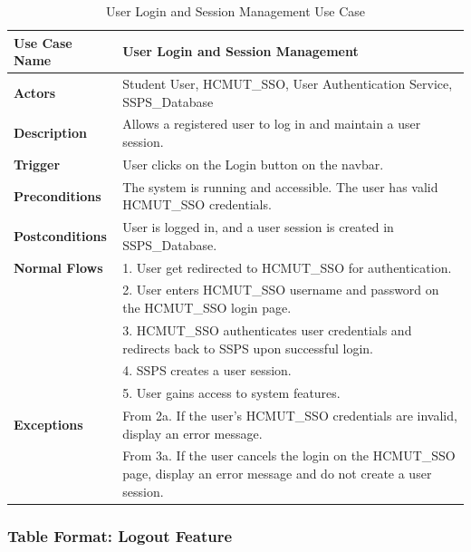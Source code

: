 \begin{table}[H]
\begin{tabular}{|p{5cm}|p{9cm}|}
\hline
\textbf{Use Case Name} & User Login and Session Management \\
\hline
\textbf{Actors} & Student User, HCMUT\_SSO, User Authentication Service, SSPS\_Database \\
\hline
\textbf{Description} & Allows a registered user to log in and maintain a user session. \\
\hline
\textbf{Trigger} & User clicks on the Login button on the navbar. \\
\hline
\textbf{Preconditions} & The system is running and accessible. The user has valid HCMUT\_SSO credentials. \\
\hline
\textbf{Postconditions} & User is logged in, and a user session is created in SSPS\_Database. \\
\hline
\textbf{Normal Flows} & 
1. User get redirected to HCMUT\_SSO for authentication. \\
&2. User enters HCMUT\_SSO username and password on the HCMUT\_SSO login page. \\
&3. HCMUT\_SSO authenticates user credentials and redirects back to SSPS upon successful login. \\
&4. SSPS creates a user session. \\
&5. User gains access to system features. \\
\hline
\textbf{Exceptions} & 
From 2a. If the user's HCMUT\_SSO credentials are invalid, display an error message. \\
&From 3a. If the user cancels the login on the HCMUT\_SSO page, display an error message and do not create a user session. \\
\hline
\end{tabular}
\caption{User Login and Session Management Use Case}
\end{table}

\subsubsection{Table Format: Logout Feature}

